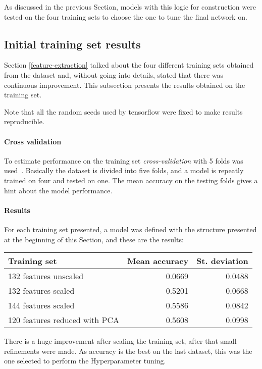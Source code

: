 As discussed in the previous Section, models with this logic for 
construction were tested on the four training sets to choose the one to tune 
the final network on.

\subsection{Initial training set results}

Section \vref{feature-extraction} talked about the four different 
training sets obtained from the dataset and, without going into details, 
stated that there was continuous improvement. This subsection presents
the results obtained on the training set. 

Note that all the random seeds used by tensorflow were fixed 
to make results reproducible.

\paragraph{Cross validation}
To estimate performance on the training set \emph{cross-validation} with 
5 folds was used~\cite{cross}. Basically the dataset is divided into five folds, 
and a model is repeatly trained on four and tested on one. 
The mean accuracy on the testing folds gives a hint about the model performance.

\paragraph{Results}
For each training set presented, a model was defined 
with the structure presented at the beginning of this Section, 
and these are the results:

\begin{center}
    \begin{tabular}{ |l|r|r| } 
        \hline
        Training set & Mean accuracy & St. deviation \\
        \hline
        132 features unscaled &  0.0669 & 0.0488 \\
        132 features scaled &  0.5201 & 0.0668 \\
        144 features scaled &  0.5586 & 0.0842 \\
        120 features reduced with PCA &  0.5608 & 0.0998 \\
        \hline
    \end{tabular}
\end{center}

There is a huge improvement after scaling the training set, after 
that small refinements were made.
As accuracy is the best on the last dataset, this was the one selected to 
perform the Hyperparameter tuning.

